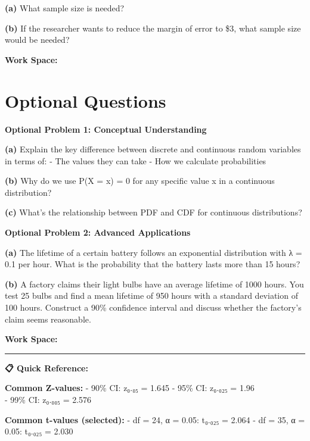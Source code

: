 \documentclass[
  11pt,
]{article}
\begin{document}
\textbf{(a)} What sample size is needed?

\textbf{(b)} If the researcher wants to reduce the margin of error to
\$3, what sample size would be needed?

\textbf{Work Space:}

\section{Optional Questions}\label{optional-questions}

\textbf{Optional Problem 1: Conceptual Understanding}

\textbf{(a)} Explain the key difference between discrete and continuous
random variables in terms of: - The values they can take - How we
calculate probabilities

\textbf{(b)} Why do we use P(X = x) = 0 for any specific value x in a
continuous distribution?

\textbf{(c)} What's the relationship between PDF and CDF for continuous
distributions?

\textbf{Optional Problem 2: Advanced Applications}

\textbf{(a)} The lifetime of a certain battery follows an exponential
distribution with λ = 0.1 per hour. What is the probability that the
battery lasts more than 15 hours?

\textbf{(b)} A factory claims their light bulbs have an average lifetime
of 1000 hours. You test 25 bulbs and find a mean lifetime of 950 hours
with a standard deviation of 100 hours. Construct a 90\% confidence
interval and discuss whether the factory's claim seems reasonable.

\textbf{Work Space:}

\begin{center}\rule{0.5\linewidth}{0.5pt}\end{center}

\textbf{📋 Quick Reference:}

\textbf{Common Z-values:} - 90\% CI: z₀.₀₅ = 1.645 - 95\% CI: z₀.₀₂₅ =
1.96\\
- 99\% CI: z₀.₀₀₅ = 2.576

\textbf{Common t-values (selected):} - df = 24, α = 0.05: t₀.₀₂₅ = 2.064
- df = 35, α = 0.05: t₀.₀₂₅ = 2.030
\end{document}
